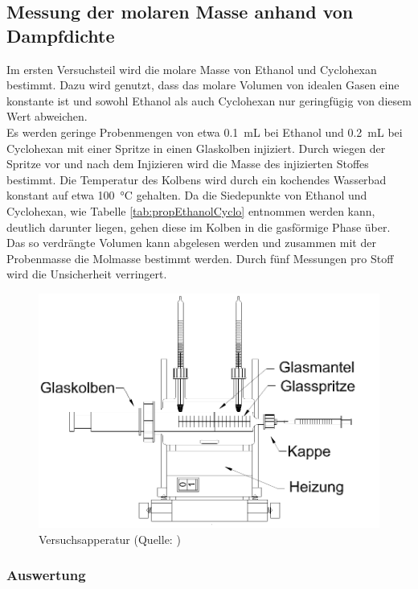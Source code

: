 \subsection{Messung der molaren Masse anhand von Dampfdichte}
Im ersten Versuchsteil wird die molare Masse von Ethanol und Cyclohexan bestimmt. Dazu wird genutzt, dass das molare Volumen von idealen Gasen eine konstante ist und sowohl Ethanol als auch Cyclohexan nur geringfügig von diesem Wert abweichen. \\
Es werden geringe Probenmengen von etwa \SI{.1}{\milli\liter} bei Ethanol und \SI{.2}{\milli\liter} bei Cyclohexan mit einer Spritze in einen Glaskolben injiziert. Durch wiegen der Spritze vor und nach dem Injizieren wird die Masse des injizierten Stoffes bestimmt. Die Temperatur des Kolbens wird durch ein kochendes Wasserbad konstant auf etwa \SI{100}{\degreeCelsius} gehalten. Da die Siedepunkte von Ethanol und Cyclohexan, wie Tabelle \ref{tab:propEthanolCyclo} entnommen werden kann, deutlich darunter liegen, gehen diese im Kolben in die gasförmige Phase über. Das so verdrängte Volumen kann abgelesen werden und zusammen mit der Probenmasse die Molmasse bestimmt werden. Durch fünf Messungen pro Stoff wird die Unsicherheit verringert.
\begin{figure}[H]
\centering
\includegraphics[width=.7\textwidth]{Bilder/aufbau_dampf.png}
\caption[Aufbau]{Versuchsapperatur (Quelle: \cite{anleitung2015})}
\label{fig:aufbau_dampf}
\end{figure}
\subsubsection{Auswertung}

